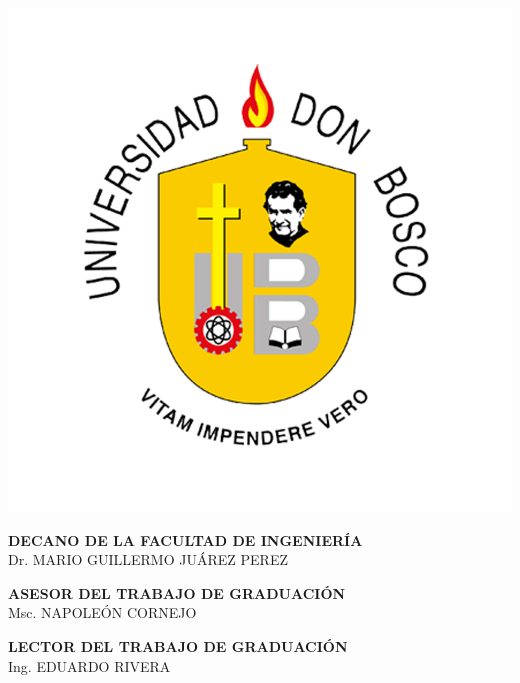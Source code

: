 \begin{titlepage}
    \vspace*{1cm}
    
    \begin{center}
         \includegraphics[scale=0.75]{document/include/Universidad_don_bosco.jpg}
    \end{center}

    \vspace*{2cm}
    \begin{center}
        \Large{\textbf{DECANO DE LA FACULTAD DE INGENIERÍA}} \\
        Dr. MARIO GUILLERMO JUÁREZ PEREZ
    \end{center}
    
    \vspace*{2cm}
    \begin{center}
        \Large{\textbf{ASESOR DEL TRABAJO DE GRADUACIÓN}} \\
        Msc. NAPOLEÓN CORNEJO
    \end{center}

    \vspace*{2cm}
    \begin{center}
        \Large{\textbf{LECTOR DEL TRABAJO DE GRADUACIÓN}} \\
        Ing. EDUARDO RIVERA
    \end{center}
    

\end{titlepage}
